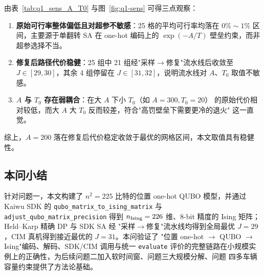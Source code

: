 \documentclass[UTF8,12pt,a4paper]{ctexart}
\begin{document}
由表~\ref{tab:q1_sens_A_T0} 与图~\ref{fig:q1-sens} 可得三点观察：
\begin{enumerate}
  \item \textbf{原始可行率整体偏低且对超参不敏感}：25 格的平均可行率均落在 $0\%\sim 1\%$
    区间，主要源于单翻转 SA 在 one-hot 编码上的 $\exp(-A/T)$ 壁垒约束，而非超参选择不当。
  \item \textbf{修复后路径代价稳健}：25 组中 21 组经"采样$\to$修复"流水线后收敛至
    $J\in[29,30]$，其余 4 组停留在 $J\in[31,32]$，说明流水线对 $A$、$T_{0}$ 取值不敏感。
  \item \textbf{$A$ 与 $T_{0}$ 存在弱耦合}：在大 $A$ 下小 $T_{0}$（如 $A=300,T_{0}=20$）
    的原始代价相对较低，而大 $A$ 大 $T_{0}$ 反而较差，符合"高罚壁垒下需要更冷的退火"
    这一直觉。
\end{enumerate}
综上，$A=200$ 落在修复后代价稳定收敛于最优的网格区间，本文取值具有稳健性。

\subsection{本问小结}

针对问题一，本文构建了 $n^{2}=225$ 比特的位置 one-hot QUBO 模型，并通过 Kaiwu SDK 的
\texttt{qubo\_matrix\_to\_ising\_matrix} 与 \texttt{adjust\_qubo\_matrix\_precision}
得到 $n_{\rm Ising}=226$ 维、8-bit 精度的 Ising 矩阵；Held--Karp 精确 DP 与 SDK SA 经
"采样$\to$修复"流水线均得到全局最优 $J=29$，CIM 真机得到接近最优的 $J=31$。本问验证了
"位置 one-hot $\to$ QUBO $\to$ Ising"编码、解码、SDK/CIM 调用与统一 \texttt{evaluate}
评价的完整链路在小规模实例上的正确性，为后续问题二加入软时间窗、问题三大规模分解、问题
四多车辆容量约束提供了方法论基础。
\end{document}
